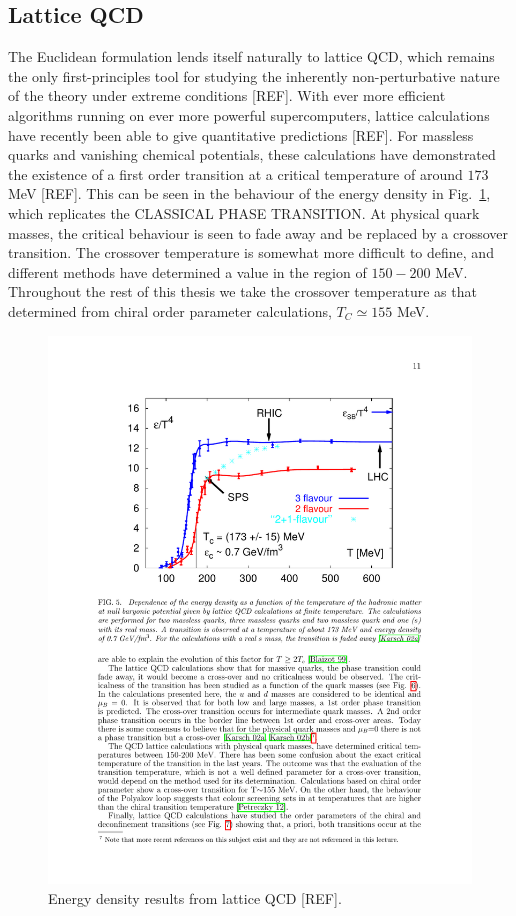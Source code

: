 \documentclass[11pt, a4paper, twoside]{book}
\begin{document}
\subsection{Lattice QCD}
\label{sec:latticeQCD}
The Euclidean formulation lends itself naturally to lattice QCD, which remains the only first-principles tool for studying the inherently non-perturbative nature of the theory under extreme conditions [REF]. With ever more efficient algorithms running on ever more powerful supercomputers, lattice calculations have recently been able to give quantitative predictions [REF]. For massless quarks and vanishing chemical potentials, these calculations have demonstrated the existence of a first order transition at a critical temperature of around \(173\) MeV [REF]. This can be seen in the behaviour of the energy density in Fig.~\ref{fig:lattice_en_den}, which replicates the CLASSICAL PHASE TRANSITION. At physical quark masses, the critical behaviour is seen to fade away and be replaced by a crossover transition. The crossover temperature is somewhat more difficult to define, and different methods have determined a value in the region of \(150-200\) MeV. Throughout the rest of this thesis we take the crossover temperature as that determined from chiral order parameter calculations, \(T_C\simeq155\) MeV.
\begin{figure}[t]
	\centering
	\includegraphics[width=\textwidth]{QCD_lat_enden}
	\caption{Energy density results from lattice QCD [REF].}\label{fig:lattice_en_den}
\end{figure}
\end{document}
